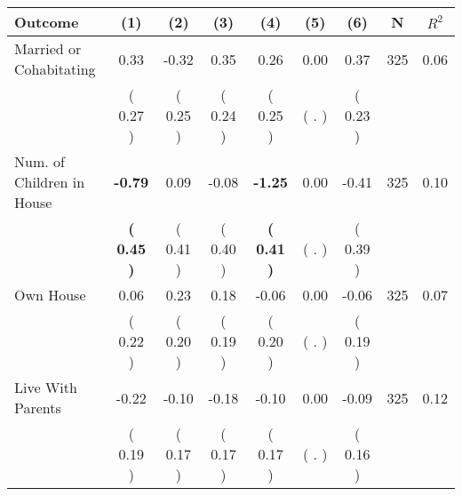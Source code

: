 \begin{tabular}{lcccccccc}
\toprule
 \textbf{Outcome} & \textbf{(1)} & \textbf{(2)} & \textbf{(3)} & \textbf{(4)} & \textbf{(5)} & \textbf{(6)} & \textbf{N} & \textbf{$ R^2$} \\
\midrule
Married or Cohabitating &      0.33 &     -0.32 &      0.35 &      0.26 &      0.00 &      0.37 & 325 &       0.06 \\ 
 & (     0.27 ) & (     0.25 ) & (     0.24 ) & (     0.25 ) & (        . ) & (     0.23 ) & \\
Num. of Children in House & \textbf{    -0.79} &      0.09 &     -0.08 & \textbf{    -1.25} &      0.00 &     -0.41 & 325 &       0.10 \\ 
 & \textbf{(     0.45 )} & (     0.41 ) & (     0.40 ) & \textbf{(     0.41 )} & (        . ) & (     0.39 ) & \\
Own House &      0.06 &      0.23 &      0.18 &     -0.06 &      0.00 &     -0.06 & 325 &       0.07 \\ 
 & (     0.22 ) & (     0.20 ) & (     0.19 ) & (     0.20 ) & (        . ) & (     0.19 ) & \\
Live With Parents &     -0.22 &     -0.10 &     -0.18 &     -0.10 &      0.00 &     -0.09 & 325 &       0.12 \\ 
 & (     0.19 ) & (     0.17 ) & (     0.17 ) & (     0.17 ) & (        . ) & (     0.16 ) & \\
\bottomrule
\end{tabular}

